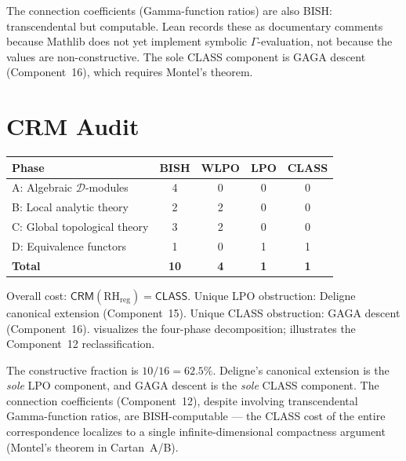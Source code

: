 \documentclass[11pt,a4paper]{article}
\theoremstyle{plain}
\theoremstyle{definition}
\newcommand{\BISH}{\textsf{BISH}}
\newcommand{\WLPO}{\textsf{WLPO}}
\newcommand{\LPO}{\textsf{LPO}}
\newcommand{\CLASS}{\textsf{CLASS}}
\newcommand{\CRM}{\textsf{CRM}}
\begin{document}
The connection coefficients (Gamma-function ratios) are also \BISH: transcendental but computable.
Lean records these as documentary comments because Mathlib does not yet implement symbolic $\Gamma$-evaluation, not because the values are non-constructive.
The sole \CLASS{} component is GAGA descent (Component~16), which requires Montel's theorem.

\section{CRM Audit}

\begin{center}
\begin{tabular}{lcccc}
\toprule
Phase & \BISH & \WLPO & \LPO & \CLASS \\
\midrule
A: Algebraic $\mathcal{D}$-modules & 4 & 0 & 0 & 0 \\
B: Local analytic theory & 2 & 2 & 0 & 0 \\
C: Global topological theory & 3 & 2 & 0 & 0 \\
D: Equivalence functors & 1 & 0 & 1 & 1 \\
\midrule
\textbf{Total} & \textbf{10} & \textbf{4} & \textbf{1} & \textbf{1} \\
\bottomrule
\end{tabular}
\end{center}

Overall cost: $\CRM(\mathrm{RH}_{\mathrm{reg}}) = \CLASS$.
Unique \LPO{} obstruction: Deligne canonical extension (Component~15).
Unique \CLASS{} obstruction: GAGA descent (Component~16).
 visualizes the four-phase decomposition;  illustrates the Component~12 reclassification.

The constructive fraction is $10/16 = 62.5\%$.
Deligne's canonical extension is the \emph{sole} \LPO{} component, and GAGA descent is the \emph{sole} \CLASS{} component.
The connection coefficients (Component~12), despite involving transcendental Gamma-function ratios, are \BISH-computable --- the \CLASS{} cost of the entire correspondence localizes to a single infinite-dimensional compactness argument (Montel's theorem in Cartan~A/B).
\end{document}
